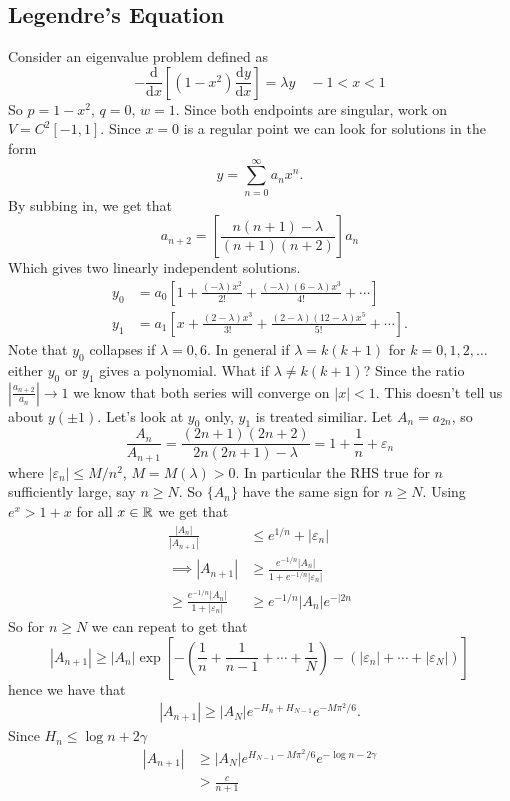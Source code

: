 \documentclass{article}
\begin{document}
\subsection{Legendre's Equation}
Consider an eigenvalue problem defined as
\[
	-\frac{\mathrm d}{\mathrm dx}\left[(1-x^2)\frac{\mathrm d y}{\mathrm dx}\right]=\lambda y\quad -1<x<1
\]
So $ p=1-x^2 $, $ q=0 $, $ w=1 $. Since both endpoints are singular, work on $ V=C^2[-1,1] $. Since $ x=0 $ is a regular point we can look for solutions in the form
\[
	y=\sum_{n=0}^\infty a_nx^n.
\]
By subbing in, we get that
\[
	a_{n+2}=\left[\frac{n(n+1)-\lambda}{(n+1)(n+2)}\right]a_n
\]
Which gives two linearly independent solutions.
\begin{align*}
	y_0&=a_0 \left[1+\frac{(-\lambda)x^2}{2!}+\frac{(-\lambda)(6-\lambda)x^3}{4!}+\cdots\right]\\
	y_1&=a_1 \left[x+\frac{(2-\lambda)x^3}{3!}+\frac{(2-\lambda)(12-\lambda)x^5}{5!}+\cdots\right].
\end{align*}
Note that $ y_0 $ collapses if $ \lambda=0,6 $. In general if $ \lambda=k(k+1) $ for $ k=0,1,2,\dots $ either $ y_0 $ or $ y_1 $ gives a polynomial. What if $ \lambda\ne k(k+1) $? Since the ratio $\left|\frac{a_{n+2}}{a_n}\right|\to 1 $ we know that both series will converge on $ |x|<1 $. This doesn't tell us about $ y(\pm 1) $. Let's look at $ y_0 $ only, $ y_1 $ is treated similiar. Let $ A_n=a_{2n} $, so
\[
	\frac{A_n}{A_{n+1}}=\frac{(2n+1)(2n+2)}{2n(2n+1)-\lambda}=1+\frac 1n+\varepsilon_n
\]
where $ |\varepsilon_n|\le M/n^2 $, $ M=M(\lambda)>0 $. In particular the RHS true for $ n $ sufficiently large, say $ n\ge N $. So $ \{A_n\} $ have the same sign for $ n\ge N $. Using $ e^x > 1+x $ for all $ x\in \mathbb{R} $ we get that
\begin{align*}
	\frac{|A_n|}{|A_{n+1}|}&\le e^{1/n}+|\varepsilon_n|\\
	\implies |A_{n+1}|&\ge \frac{e^{-1/n}|A_n|}{1+e^{-1/n}|\varepsilon_n|}\\
	\ge \frac{e^{-1/n}|A_n|}{1+|\varepsilon_n|}&\ge e^{-1/n}|A_n|e^{-|2n}
\end{align*}
So for $ n\ge N $ we can repeat to get that
\[
	|A_{n+1}|\ge |A_n|\exp\left[-\left(\frac 1n+ \frac 1{n-1}+\cdots + \frac 1N\right)-\left(|\varepsilon_n|+\cdots + |\varepsilon_N|\right)\right]
\]
hence we have that
\begin{align*}
	|A_{n+1}|\ge |A_N|e^{-H_n+H_{N-1}}e^{-M\pi^2/6}.
\end{align*}
Since $ H_n\le \log n +2\gamma $
\begin{align*}
	|A_{n+1}|&\ge |A_N|e^{H_{N-1}-M\pi^2/6}e^{-\log n-2\gamma}\\
		 &> \frac{c}{n+1}
\end{align*}
\end{document}
